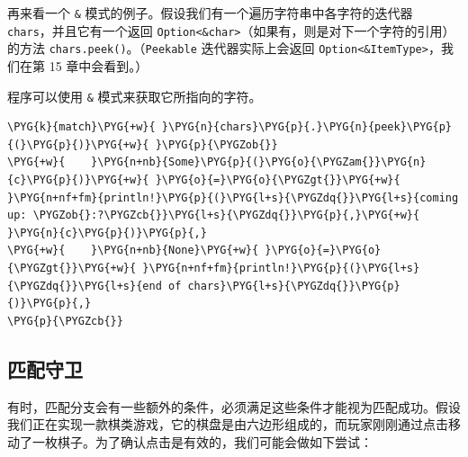 再来看一个 \texttt{\&} 模式的例子。假设我们有一个遍历字符串中各字符的迭代器 \texttt{chars}，并且它有一个返回 \texttt{Option<\&char>}（如果有，则是对下一个字符的引用）的方法 \texttt{chars.peek()}。（\texttt{Peekable} 迭代器实际上会返回 \texttt{Option<\&ItemType>}，我们在第 15 章中会看到。）

程序可以使用 \texttt{\&} 模式来获取它所指向的字符。

\begin{Verbatim}[commandchars=\\\{\},breaklines=true,breakanywhere=true,fontsize=\codefont,xleftmargin=17bp]
\PYG{k}{match}\PYG{+w}{ }\PYG{n}{chars}\PYG{p}{.}\PYG{n}{peek}\PYG{p}{(}\PYG{p}{)}\PYG{+w}{ }\PYG{p}{\PYGZob{}}
\PYG{+w}{    }\PYG{n+nb}{Some}\PYG{p}{(}\PYG{o}{\PYGZam{}}\PYG{n}{c}\PYG{p}{)}\PYG{+w}{ }\PYG{o}{=}\PYG{o}{\PYGZgt{}}\PYG{+w}{ }\PYG{n+nf+fm}{println!}\PYG{p}{(}\PYG{l+s}{\PYGZdq{}}\PYG{l+s}{coming up: \PYGZob{}:?\PYGZcb{}}\PYG{l+s}{\PYGZdq{}}\PYG{p}{,}\PYG{+w}{ }\PYG{n}{c}\PYG{p}{)}\PYG{p}{,}
\PYG{+w}{    }\PYG{n+nb}{None}\PYG{+w}{ }\PYG{o}{=}\PYG{o}{\PYGZgt{}}\PYG{+w}{ }\PYG{n+nf+fm}{println!}\PYG{p}{(}\PYG{l+s}{\PYGZdq{}}\PYG{l+s}{end of chars}\PYG{l+s}{\PYGZdq{}}\PYG{p}{)}\PYG{p}{,}
\PYG{p}{\PYGZcb{}}
\end{Verbatim}

\subsection{匹配守卫}

有时，匹配分支会有一些额外的条件，必须满足这些条件才能视为匹配成功。假设我们正在实现一款棋类游戏，它的棋盘是由六边形组成的，而玩家刚刚通过点击移动了一枚棋子。为了确认点击是有效的，我们可能会做如下尝试：


